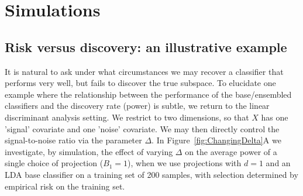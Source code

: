 \documentclass[12pt]{article}
\begin{document}

\section{Simulations}
\subsection{Risk versus discovery: an illustrative example}
It is natural to ask under what circumstances we may recover a classifier that performs very well, but fails to discover the true subspace. To elucidate one example where the relationship between the performance of the base/ensembled classifiers and the discovery rate (power) is subtle, we return to the linear discriminant analysis setting. We restrict to two dimensions, so that $X$ has one 'signal' covariate and one 'noise' covariate. We may then directly control the signal-to-noise ratio via the parameter $\Delta$. In Figure~\ref{fig:ChangingDelta}A we investigate, by simulation, the effect of varying $\Delta$ on the average power of a single choice of projection ($B_1 = 1$), when we use projections with $d=1$ and an LDA base classifier on a training set of 200 samples, with selection determined by empirical risk on the training set. 
\end{document}

